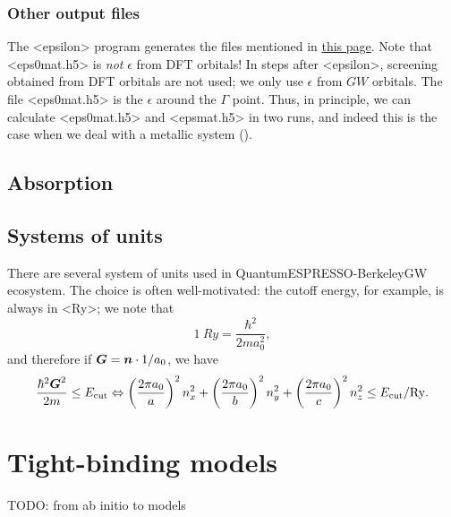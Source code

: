 \documentclass[hyperref, a4paper, 12pt]{report}
\def\ce#1{<#1>}%
\def\texttt#1{<#1>}%
\newcommand{\shortcode}[1]{\texttt{#1}}
\begin{document}
\subsection{Other output files}

The \shortcode{epsilon} program generates the files mentioned in 
\href{http://manual.berkeleygw.org/2.0/epsilon-overview/}{this page}.
Note that \shortcode{eps0mat.h5} is \emph{not} $\epsilon$ from DFT orbitals!
In steps after \shortcode{epsilon},
screening obtained from DFT orbitals are not used;
we only use $\epsilon$ from $GW$ orbitals.
The file \shortcode{eps0mat.h5} is the $\epsilon$ around the $\Gamma$ point.
Thus, in principle,
we can calculate \shortcode{eps0mat.h5} and \shortcode{epsmat.h5}
in two runs,
and indeed this is the case when we deal with a metallic system
().

\section{Absorption}

\subsection{}

\section{Systems of units}

There are several system of units used in QuantumESPRESSO-BerkeleyGW ecosystem.
The choice is often well-motivated: 
the cutoff energy, for example, 
is always in \ce{Ry};
we note that 
\begin{equation}
    \SI{1}{Ry} = \frac{\hbar^2}{2 m a_0^2},
\end{equation}
and therefore if $\vb*{G} = \vb*{n} \cdot 1 / a_0$, we have 
\begin{equation}
    \frac{\hbar^2 \vb*{G}^2}{2m} \leq E_{\text{cut}} \Leftrightarrow
    \left(\frac{2\pi a_0}{a}\right)^2 n_x^2 + \left(\frac{2 \pi a_0}{b}\right)^2 n_y^2 + \left(\frac{2 \pi a_0}{c}\right)^2 n_z^2 \leq E_{\text{cut}} / \unit{Ry}.
\end{equation}

\chapter{Tight-binding models}

TODO: from ab initio to models
\end{document}
